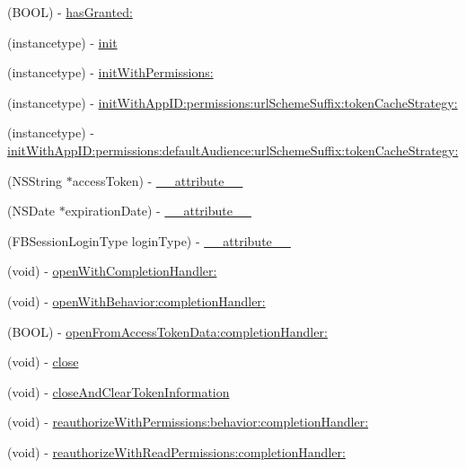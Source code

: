 \begin{DoxyCompactItemize}
\item 
(B\+O\+OL) -\/ \hyperlink{interfaceFBSession_aa74d6239fcde1f9d6dd9530538eb691b}{has\+Granted\+:}
\item 
(instancetype) -\/ \hyperlink{interfaceFBSession_ac5ec026f515c232cd4498cf2bc4022b4}{init}
\item 
(instancetype) -\/ \hyperlink{interfaceFBSession_a3f8419d590fb8f950aa9aee7110fb5e6}{init\+With\+Permissions\+:}
\item 
(instancetype) -\/ \hyperlink{interfaceFBSession_ae73ce3214852d1af28cbb02e7f733b37}{init\+With\+App\+I\+D\+:permissions\+:url\+Scheme\+Suffix\+:token\+Cache\+Strategy\+:}
\item 
(instancetype) -\/ \hyperlink{interfaceFBSession_a7f878c2e85b4f400378bf0c00314e7c3}{init\+With\+App\+I\+D\+:permissions\+:default\+Audience\+:url\+Scheme\+Suffix\+:token\+Cache\+Strategy\+:}
\item 
(N\+S\+String $\ast$access\+Token) -\/ \hyperlink{interfaceFBSession_a129a9e2b497ba201043bb82244156341}{\+\_\+\+\_\+attribute\+\_\+\+\_\+}
\item 
(N\+S\+Date $\ast$expiration\+Date) -\/ \hyperlink{interfaceFBSession_a42e6a02db4caa8197e8fc851bc18f1e1}{\+\_\+\+\_\+attribute\+\_\+\+\_\+}
\item 
(F\+B\+Session\+Login\+Type login\+Type) -\/ \hyperlink{interfaceFBSession_acd3c247502e2514d93ccf123ad4824f8}{\+\_\+\+\_\+attribute\+\_\+\+\_\+}
\item 
(void) -\/ \hyperlink{interfaceFBSession_a874152230789c87cd181d1f976e3715f}{open\+With\+Completion\+Handler\+:}
\item 
(void) -\/ \hyperlink{interfaceFBSession_add7058f99fde92c093a92acf192dcd0a}{open\+With\+Behavior\+:completion\+Handler\+:}
\item 
(B\+O\+OL) -\/ \hyperlink{interfaceFBSession_a669e34ba5599646255507299f7a60dac}{open\+From\+Access\+Token\+Data\+:completion\+Handler\+:}
\item 
(void) -\/ \hyperlink{interfaceFBSession_a91eccb960e90fc8cc6d24df1b2e94ce3}{close}
\item 
(void) -\/ \hyperlink{interfaceFBSession_ac4ad0564da77b3cecc0c67f762f5f1c7}{close\+And\+Clear\+Token\+Information}
\item 
(void) -\/ \hyperlink{interfaceFBSession_ac78d18a8fc82c995e326f2866ca9298f}{reauthorize\+With\+Permissions\+:behavior\+:completion\+Handler\+:}
\item 
(void) -\/ \hyperlink{interfaceFBSession_a5c15996bb59afc28460f92645cf6e7f0}{reauthorize\+With\+Read\+Permissions\+:completion\+Handler\+:}

\end{DoxyCompactItemize}
